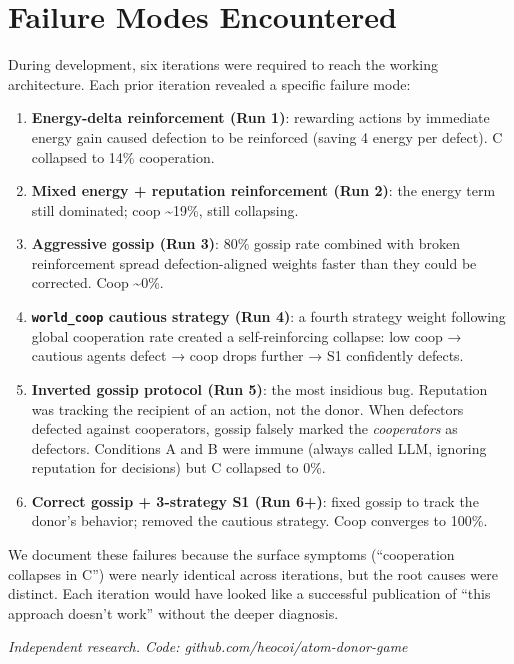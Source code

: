\documentclass[
  11pt,
  letterpaper,
]{article}
\providecommand{\tightlist}{%
  \setlength{\itemsep}{0pt}\setlength{\parskip}{0pt}}
\begin{document}
\section{Failure Modes Encountered}\label{failure-modes-encountered}

During development, six iterations were required to reach the working
architecture. Each prior iteration revealed a specific failure mode:

\begin{enumerate}
\def\labelenumi{\arabic{enumi}.}
\tightlist
\item
  \textbf{Energy-delta reinforcement (Run 1)}: rewarding actions by
  immediate energy gain caused defection to be reinforced (saving 4
  energy per defect). C collapsed to 14\% cooperation.
\item
  \textbf{Mixed energy + reputation reinforcement (Run 2)}: the energy
  term still dominated; coop \textasciitilde19\%, still collapsing.
\item
  \textbf{Aggressive gossip (Run 3)}: 80\% gossip rate combined with
  broken reinforcement spread defection-aligned weights faster than they
  could be corrected. Coop \textasciitilde0\%.
\item
  \textbf{\texttt{world\_coop} cautious strategy (Run 4)}: a fourth
  strategy weight following global cooperation rate created a
  self-reinforcing collapse: low coop → cautious agents defect → coop
  drops further → S1 confidently defects.
\item
  \textbf{Inverted gossip protocol (Run 5)}: the most insidious bug.
  Reputation was tracking the recipient of an action, not the donor.
  When defectors defected against cooperators, gossip falsely marked the
  \emph{cooperators} as defectors. Conditions A and B were immune
  (always called LLM, ignoring reputation for decisions) but C collapsed
  to 0\%.
\item
  \textbf{Correct gossip + 3-strategy S1 (Run 6+)}: fixed gossip to
  track the donor's behavior; removed the cautious strategy. Coop
  converges to 100\%.
\end{enumerate}

We document these failures because the surface symptoms (``cooperation
collapses in C'') were nearly identical across iterations, but the root
causes were distinct. Each iteration would have looked like a successful
publication of ``this approach doesn't work'' without the deeper
diagnosis.

\emph{Independent research. Code: github.com/heocoi/atom-donor-game}
\end{document}
